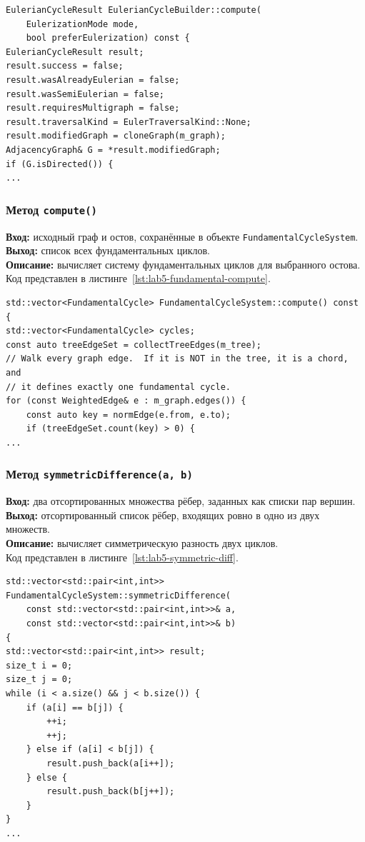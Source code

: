 \documentclass[14pt,a4paper]{extarticle}
\newcommand{\funcblock}[5]{%
\subsubsection*{Метод \code{#1}}
\noindent
\textbf{Вход:} #2\\
\textbf{Выход:} #3\\
\textbf{Описание:} #4\\
Код представлен в листинге~\ref{#5}.%
}
\newcommand{\code}[1]{\texttt{#1}}
\begin{document}
\begin{lstlisting}[style=cppcode,caption={Фрагмент функции \code{compute(mode)}},label={lst:lab5-euler-compute}]
EulerianCycleResult EulerianCycleBuilder::compute(
    EulerizationMode mode,
    bool preferEulerization) const {
EulerianCycleResult result;
result.success = false;
result.wasAlreadyEulerian = false;
result.wasSemiEulerian = false;
result.requiresMultigraph = false;
result.traversalKind = EulerTraversalKind::None;
result.modifiedGraph = cloneGraph(m_graph);
AdjacencyGraph& G = *result.modifiedGraph;
if (G.isDirected()) {
...
\end{lstlisting}

\funcblock{compute()}{исходный граф и остов, сохранённые в объекте \code{FundamentalCycleSystem}.}{список всех фундаментальных циклов.}{вычисляет систему фундаментальных циклов для выбранного остова.}{lst:lab5-fundamental-compute}

\begin{lstlisting}[style=cppcode,caption={Фрагмент функции \code{compute()}},label={lst:lab5-fundamental-compute}]
std::vector<FundamentalCycle> FundamentalCycleSystem::compute() const {
std::vector<FundamentalCycle> cycles;
const auto treeEdgeSet = collectTreeEdges(m_tree);
// Walk every graph edge.  If it is NOT in the tree, it is a chord, and
// it defines exactly one fundamental cycle.
for (const WeightedEdge& e : m_graph.edges()) {
    const auto key = normEdge(e.from, e.to);
    if (treeEdgeSet.count(key) > 0) {
...
\end{lstlisting}

\funcblock{symmetricDifference(a, b)}{два отсортированных множества рёбер, заданных как списки пар вершин.}{отсортированный список рёбер, входящих ровно в одно из двух множеств.}{вычисляет симметрическую разность двух циклов.}{lst:lab5-symmetric-diff}
\begin{lstlisting}[style=cppcode,caption={Фрагмент функции \code{symmetricDifference(a, b)}},label={lst:lab5-symmetric-diff}]
std::vector<std::pair<int,int>> FundamentalCycleSystem::symmetricDifference(
    const std::vector<std::pair<int,int>>& a,
    const std::vector<std::pair<int,int>>& b)
{
std::vector<std::pair<int,int>> result;
size_t i = 0;
size_t j = 0;
while (i < a.size() && j < b.size()) {
    if (a[i] == b[j]) {
        ++i;
        ++j;
    } else if (a[i] < b[j]) {
        result.push_back(a[i++]);
    } else {
        result.push_back(b[j++]);
    }
}
...
\end{lstlisting}
\end{document}

